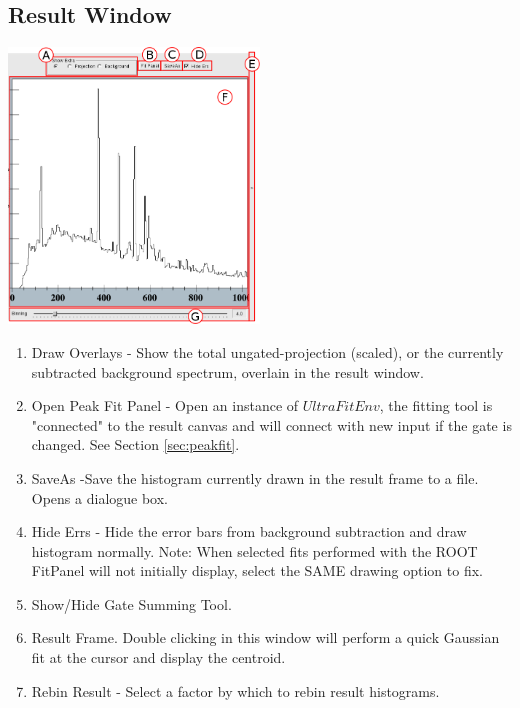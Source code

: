 \documentclass[a4paper,10pt]{article}
\begin{document}
\subsection{Result Window}
\begin{center}
\includegraphics[width=0.5\textwidth]{toolD.png}
\end{center}
\begin{enumerate}
\item Draw Overlays - Show the total ungated-projection (scaled), or the currently subtracted background spectrum, overlain in the result window.
\item Open Peak Fit Panel - Open an instance of $UltraFitEnv$, the fitting tool is "connected" to the result canvas and will connect with new input if the gate is changed. See Section \ref{sec:peakfit}.
\item SaveAs -Save the histogram currently drawn in the result frame to a file. Opens a dialogue box.
\item Hide Errs - Hide the error bars from background subtraction and draw histogram normally. Note: When selected fits performed with the ROOT FitPanel will not initially display, select the SAME drawing option to fix.
\item Show/Hide Gate Summing Tool.
\item Result Frame. Double clicking in this window will perform a quick Gaussian fit at the cursor and display the centroid.
\item Rebin Result - Select a factor by which to rebin result histograms.
\end{enumerate}
\end{document}
